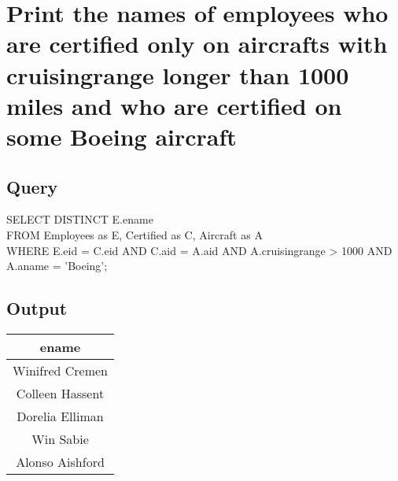 \documentclass[11pt]{scrartcl} %
\begin{document}
\section{Print the names of employees who are certified only on aircrafts with cruisingrange longer than 1000 miles and who are certified on some Boeing aircraft }

\subsection{Query}
SELECT DISTINCT E.ename\\
  FROM Employees as E, Certified as C, Aircraft as A\\
  WHERE E.eid = C.eid AND
        C.aid = A.aid AND
        A.cruisingrange > 1000 AND
        A.aname = 'Boeing';
\subsection{Output}
\begin{left}
\begin{tabular}{ | c | }
\hline
\textbf{ename} \\
\hline
Winifred Cremen\\
Colleen Hassent\\
Dorelia Elliman\\
Win Sabie\\
Alonso Aishford\\

\hline
\end{tabular}
\end{left}



\end{document}
